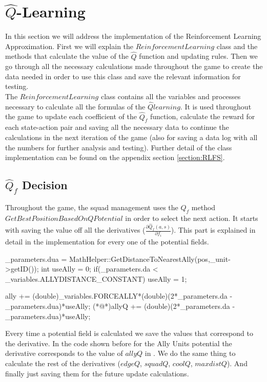 \newpage
\section{$ \hat{Q}$-Learning}
\label{section:reinforcement}
In this section we will address the implementation of the Reinforcement Learning Approximation. First we will explain the $ReinforcementLearning$ class and the methods that calculate the value of the $\hat{Q}$ function and updating rules. Then we go through all the necessary calculations made throughout the game to create the data needed in order to use this class and save the relevant information for testing.\\

The $ReinforcementLearning$ class contains all the variables and processes necessary to calculate all the formulas of the $\hat{Q} learning$. It is used throughout the game to update each coefficient of the $\hat{Q}_f$ function, calculate the reward for each state-action pair and saving all the necessary data to continue the calculations in the next iteration of the game (also for saving a data log with all the numbers for further analysis and testing). Further detail of the class implementation can be found on the appendix section \ref{section:RLFS}. 

\subsection{$\hat{Q}_f$ Decision} \label{rlMethods}

Throughout the game, the squad management uses the $\hat{Q}_f$ method \\
$GetBestPositionBasedOnQPotential$ in order to select the next action. It starts with saving the value off all the derivatives ($\frac{\partial \hat{Q}_f(a,s)}{\partial f_i}$). This part is explained in detail in the implementation for every one of the potential fields. \\

\begin{Sourcecode}[caption=Ally units]
_parameters.dua = MathHelper::GetDistanceToNearestAlly(pos,_unit->getID());
int useAlly = 0;
if(_parameters.da < _variables.ALLYDISTANCE_CONSTANT)
	useAlly = 1;

ally += (double)_variables.FORCEALLY*(double)(2*_parameters.da - _parameters.dua)*useAlly;
(*@\lnote@*)allyQ += (double)(2*_parameters.da - _parameters.dua)*useAlly;
\end{Sourcecode}	

Every time a potential field is calculated we save the values that correspond to the derivative. In the code shown before for the Ally Units potential the derivative corresponds to the value of $allyQ$ in . We do the same thing to calculate the rest of the derivatives ($edgeQ$, $squadQ$, $coolQ$, $maxdistQ$). And finally just saving them for the future update calculations.\\ 

